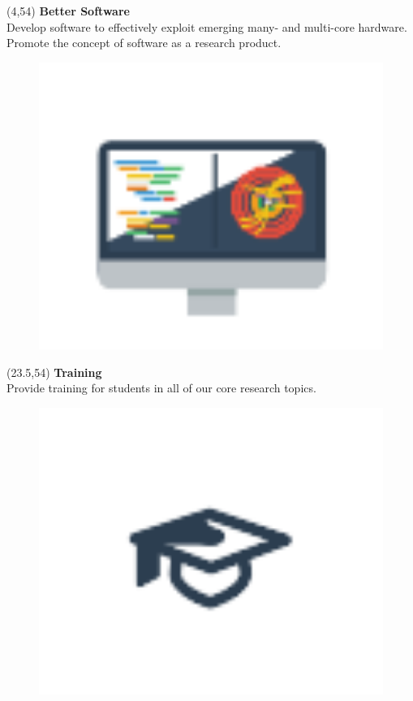 \begin{textblock}{17.5}(4,54)
{\bf Better Software} \\
Develop software to effectively exploit emerging many- and multi-core hardware. 
Promote the concept of software as a research product.
\begin{figure}[tbph]
\centering
\includegraphics[width=1.0\textwidth]{better-software.png}
\end{figure}
\end{textblock}

\begin{textblock}{17.5}(23.5,54)
{\bf Training} \\
Provide training for students in all of our core research topics.
\begin{figure}[tbph]
\centering
\includegraphics[width=1.0\textwidth]{training.png}
\end{figure}
\end{textblock}



